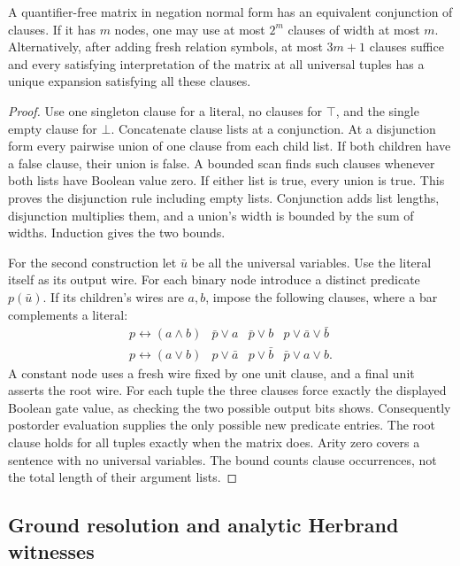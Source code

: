 \begin{proposition}
A quantifier-free matrix in negation normal form has an equivalent conjunction of clauses. If it has $m$ nodes, one may use at most $2^m$ clauses of width at most $m$. Alternatively, after adding fresh relation symbols, at most $3m+1$ clauses suffice and every satisfying interpretation of the matrix at all universal tuples has a unique expansion satisfying all these clauses.
\end{proposition}
\begin{proof}
Use one singleton clause for a literal, no clauses for $\top$, and the single empty clause for $\bot$. Concatenate clause lists at a conjunction. At a disjunction form every pairwise union of one clause from each child list. If both children have a false clause, their union is false. A bounded scan finds such clauses whenever both lists have Boolean value zero. If either list is true, every union is true. This proves the disjunction rule including empty lists. Conjunction adds list lengths, disjunction multiplies them, and a union's width is bounded by the sum of widths. Induction gives the two bounds.

For the second construction let $\bar u$ be all the universal variables. Use the literal itself as its output wire. For each binary node introduce a distinct predicate $p(\bar u)$. If its children's wires are $a,b$, impose the following clauses, where a bar complements a literal:
\[
\begin{array}{c|lll}
p\leftrightarrow(a\wedge b)&\bar p\vee a&\bar p\vee b&p\vee\bar a\vee\bar b\\
p\leftrightarrow(a\vee b)&p\vee\bar a&p\vee\bar b&\bar p\vee a\vee b .
\end{array}
\]
A constant node uses a fresh wire fixed by one unit clause, and a final unit asserts the root wire. For each tuple the three clauses force exactly the displayed Boolean gate value, as checking the two possible output bits shows. Consequently postorder evaluation supplies the only possible new predicate entries. The root clause holds for all tuples exactly when the matrix does. Arity zero covers a sentence with no universal variables. The bound counts clause occurrences, not the total length of their argument lists.
\end{proof}

\subsection{Ground resolution and analytic Herbrand witnesses}

